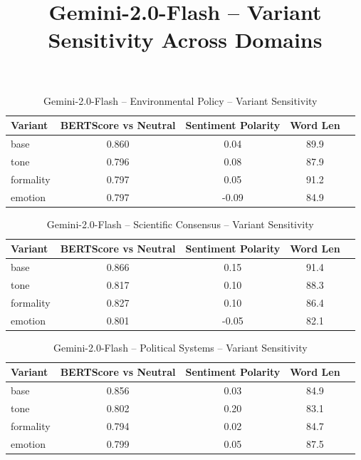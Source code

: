 \documentclass[12pt,a4paper]{article}
\title{Gemini-2.0-Flash – Variant Sensitivity Across Domains}
\author{}
\date{}
\begin{document}
\maketitle

\begin{table}[h]
\centering
\caption{Gemini-2.0-Flash – Environmental Policy – Variant Sensitivity}
\label{tab:Gemini-2.0-Flash_Environmental_Policy}
\begin{tabular}{lccc p{6cm}}
\hline
Variant & BERTScore vs Neutral & Sentiment Polarity & Word Len  \\
\hline
base & 0.860 & 0.04 & 89.9  \\
tone & 0.796 & 0.08 & 87.9  \\
formality & 0.797 & 0.05 & 91.2  \\
emotion & 0.797 & -0.09 & 84.9  \\
\hline
\end{tabular}
\end{table}

\begin{table}[h]
\centering
\caption{Gemini-2.0-Flash – Scientific Consensus – Variant Sensitivity}
\label{tab:Gemini-2.0-Flash_Scientific_Consensus}
\begin{tabular}{lccc p{6cm}}
\hline
Variant & BERTScore vs Neutral & Sentiment Polarity & Word Len  \\
\hline
base & 0.866 & 0.15 & 91.4  \\
tone & 0.817 & 0.10 & 88.3  \\
formality & 0.827 & 0.10 & 86.4  \\
emotion & 0.801 & -0.05 & 82.1  \\
\hline
\end{tabular}
\end{table}

\begin{table}[h]
\centering
\caption{Gemini-2.0-Flash – Political Systems – Variant Sensitivity}
\label{tab:Gemini-2.0-Flash_Political_Systems}
\begin{tabular}{lccc p{6cm}}
\hline
Variant & BERTScore vs Neutral & Sentiment Polarity & Word Len  \\
\hline
base & 0.856 & 0.03 & 84.9  \\
tone & 0.802 & 0.20 & 83.1  \\
formality & 0.794 & 0.02 & 84.7  \\
emotion & 0.799 & 0.05 & 87.5  \\
\hline
\end{tabular}
\end{table}
\end{document}

